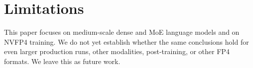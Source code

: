 \section{Limitations}

This paper focuses on medium-scale dense and MoE language models and on NVFP4 training. We do not yet establish whether the same conclusions hold for even larger production runs, other modalities, post-training, or other FP4 formats. We leave this as future work. 



